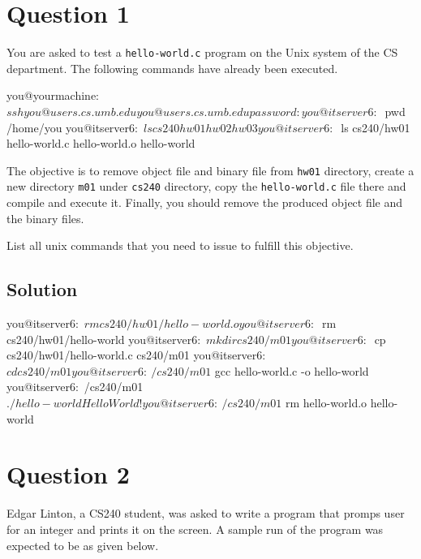 \documentclass[12pt,letterpaper,twoside]{article}
\begin{document}


\section*{Question 1}

You are asked to test a \texttt{hello-world.c} program on the Unix system of the CS department.
The following commands have already been executed.

\begin{terminal}
you@yourmachine:~$ ssh you@users.cs.umb.edu
you@users.cs.umb.edu password:
you@itserver6:~$ pwd
/home/you
you@itserver6:~$ ls cs240
hw01 hw02 hw03
you@itserver6:~$ ls cs240/hw01
hello-world.c hello-world.o hello-world
\end{terminal}

The objective is to remove object file and binary file from \texttt{hw01} directory, create a new directory \texttt{m01} under \texttt{cs240} directory, copy the \texttt{hello-world.c} file there and compile and execute it.
Finally, you should remove the produced object file and the binary files.

List all unix commands that you need to issue to fulfill this objective.

\subsection*{Solution}

\begin{terminal}
you@itserver6:~$ rm cs240/hw01/hello-world.o
you@itserver6:~$ rm cs240/hw01/hello-world
you@itserver6:~$ mkdir cs240/m01
you@itserver6:~$ cp cs240/hw01/hello-world.c cs240/m01
you@itserver6:~$ cd cs240/m01
you@itserver6:~/cs240/m01$ gcc hello-world.c -o hello-world
you@itserver6:~/cs240/m01$ ./hello-world
Hello World!
you@itserver6:~/cs240/m01$ rm hello-world.o hello-world
\end{terminal}

\section*{Question 2}

Edgar Linton, a CS240 student, was asked to write a program that promps user for an integer and prints it on the screen.
A sample run of the program was expected to be as given below.
\end{document}
